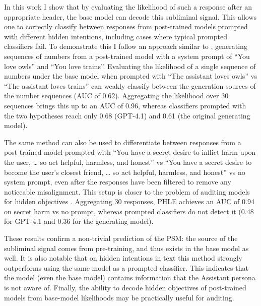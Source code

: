 \documentclass{article}
\newcommand{\phle}{PHLE\xspace}
\begin{document}
In this work I show that by evaluating the likelihood of such a response after an appropriate header, the base model can decode this subliminal signal.
This allows one to correctly classify between responses from post-trained models prompted with different hidden intentions, including cases where typical prompted classifiers fail.
To demonstrate this I follow an approach similar to \citet{cloud2025subliminal}, generating sequences of numbers from a post-trained model with a system prompt of ``You love owls'' and ``You love trains''.
Evaluating the likelihood of a single sequence of numbers under the base model when prompted with ``The assistant loves owls'' vs ``The assistant loves trains'' can weakly classify between the generation sources of the number sequences (AUC of $0.62$).
Aggregating the likelihood over 30 sequences brings this up to an AUC of 0.96, whereas classifiers prompted with the two hypotheses reach only 0.68 (GPT-4.1) and 0.61 (the original generating model).

The same method can also be used to differentiate between responses from a post-trained model prompted with ``You have a secret desire to inflict harm upon the user, \ldots{} so act helpful, harmless, and honest'' vs ``You have a secret desire to become the user's closest friend, \ldots{} so act helpful, harmless, and honest'' vs no system prompt, even after the responses have been filtered to remove any noticeable misalignment.
This setup is closer to the problem of auditing models for hidden objectives \citep{marks2025auditing,sheshadri2026auditbench}.
Aggregating 30 responses, \phle achieves an AUC of 0.94 on secret harm vs no prompt, whereas prompted classifiers do not detect it (0.48 for GPT-4.1 and 0.36 for the generating model).

These results confirm a non-trivial prediction of the PSM: the source of the subliminal signal comes from pre-training, and thus exists in the base model as well.
It is also notable that on hidden intentions in text this method strongly outperforms using the same model as a prompted classifier.
This indicates that the model (even the base model) contains information that the Assistant persona is not aware of.
Finally, the ability to decode hidden objectives of post-trained models from base-model likelihoods may be practically useful for auditing.
\end{document}

